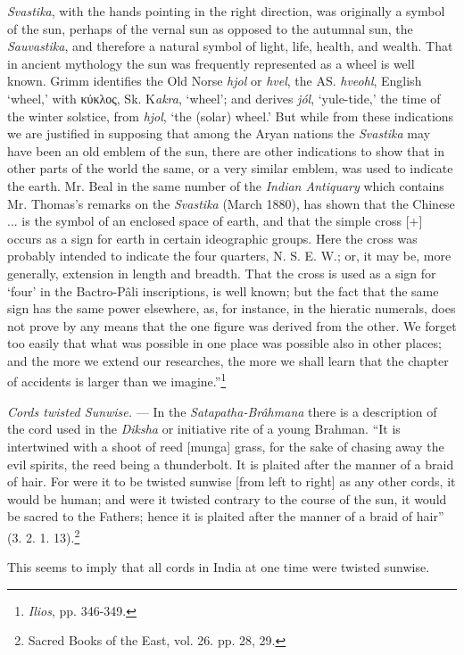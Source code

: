 \documentclass[a4paper, 11pt, oneside, polutonikogreek, english]{article}
\begin{document}
\emph{Svastika}, with the hands pointing in the right direction, was originally a symbol of the sun, perhaps of the vernal sun as opposed to the autumnal sun, the \emph{Sauvastika}, and therefore a natural symbol of light, life, health, and wealth. That in ancient mythology the sun was frequently represented as a wheel is well known. Grimm identifies the Old Norse \emph{hjol} or \emph{hvel}, the AS. \emph{hveohl}, English `wheel,' with κύκλος, Sk. K\emph{akra}, `wheel'; and derives \emph{jól}, `yule-tide,' the time of the winter solstice, from \emph{hjol}, `the (solar) wheel.' But while from these indications we are justified in supposing that among the Aryan nations the \emph{Svastika} may have been an old emblem of the sun, there are other indications to show that in other parts of the world the same, or a very similar emblem, was used to indicate the earth. Mr. Beal in the same number of the \emph{Indian Antiquary} which contains Mr. Thomas's remarks on the \emph{Svastika} (March 1880), has shown that the Chinese ... is the symbol of an enclosed space of earth, and that the simple cross [+] occurs as a sign for earth in certain ideographic groups. Here the cross was probably intended to indicate the four quarters, N. S. E. W.; or, it may be, more generally, extension in length and breadth. That the cross is used as a sign for `four' in the Bactro-Pâli inscriptions, is well known; but the fact that the same sign has the same power elsewhere, as, for instance, in the hieratic numerals, does not prove by any means that the one figure was derived from the other. We forget too easily that what was possible in one place was possible also in other places; and the more we extend our researches, the more we shall learn that the chapter of accidents is larger than we imagine.''\footnote{\emph{Ilios}, pp. 346-349.}

\emph{Cords twisted Sunwise.} --- In the \emph{Satapatha-Brâhmana} there is a description of the cord used in the \emph{Diksha} or initiative rite of a young Brahman. ``It is intertwined with a shoot of reed [munga] grass, for the sake of chasing away the evil spirits, the reed being a thunderbolt. It is plaited after the manner of a braid of hair. For were it to be twisted sunwise [from left to right] as any other cords, it would be human; and were it twisted contrary to the course of the sun, it would be sacred to the Fathers; hence it is plaited after the manner of a braid of hair'' (3. 2. 1. 13).\footnote{Sacred Books of the East, vol. 26. pp. 28, 29.}

This seems to imply that all cords in India at one time were twisted sunwise.
\end{document}
